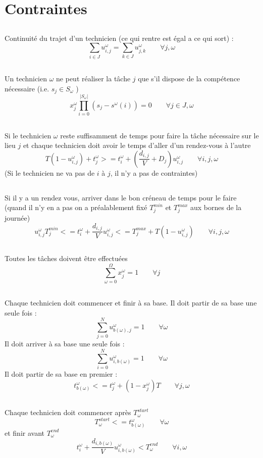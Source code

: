 \documentclass[a4paper, 11pt]{article} %
\begin{document}
\section{Contraintes}
\subsection{}
Continuité du trajet d'un technicien (ce qui rentre est égal a ce qui sort) :
$$  \sum_{ i \in J} u_{i,j}^{\omega} = \sum_{ k \in J} u_{j,k}^{\omega} \qquad \forall j,\omega $$

\subsection{}
Un technicien $\omega$ ne peut réaliser la tâche $j$ que s'il dispose de la compétence nécessaire (i.e. $s_j \in S_{\omega}$ )
$$ x_j^{\omega}\prod_{i=0}^{|S_{\omega}|}(s_j - s^{\omega}(i)) = 0 \qquad \forall j \in J ,\omega$$

\subsection{}
Si le technicien $\omega$ reste suffisamment de temps pour faire la tâche nécessaire sur le lieu $j$ et chaque technicien doit avoir le temps d'aller d'un rendez-vous à l'autre
$$ T(1-u_{i,j}^{\omega}) + t_j^{\omega} >= t_i^{\omega} + (\frac{d_{i,j}}{V} + D_j)u_{i,j}^{\omega} \qquad \forall i,j,\omega $$
(Si le technicien ne va pas de $i$ à $j$, il n'y a pas de contraintes)

\subsection{}
Si il y a un rendez vous, arriver dans le bon créneau de temps pour le faire (quand il n'y en a pas on a préalablement fixé $T_j^{min}$ et $T_j^{max}$ aux bornes de la journée)
$$ u_{i,j}^{\omega} T_j^{min} <= t_i^{\omega} + \frac{d_{i,j}}{V}u_{i,j}^{\omega} <= T_j^{max} +  T(1-u_{i,j}^{\omega}) \qquad \forall i,j,\omega $$

\subsection{}
Toutes les tâches doivent être effectuées
$$ \sum_{\omega=0}^{\Omega} x_j^{\omega} = 1 \qquad \forall j$$

\subsection{}
Chaque technicien doit commencer et finir à sa base.
Il doit partir de sa base une seule fois :
$$ \sum_{j=0}^{N} u_{b(\omega),j}^{\omega} = 1 \qquad \forall \omega$$
Il doit arriver à sa base une seule fois :
$$ \sum_{i=0}^{N} u_{i,b(\omega)}^{\omega} = 1 \qquad \forall \omega$$
Il doit partir de sa base en premier :
$$ t_{b(\omega)}^{\omega} <=  t_j^{\omega} + (1-x_j^{\omega})T \qquad \forall j,\omega$$

\subsection{}
Chaque technicien doit commencer après $T_{\omega}^{start}$ 
$$ T_{\omega}^{start} <=  t_{b(\omega)}^{\omega} \qquad \forall \omega$$
et finir avant $T_{\omega}^{end}$
$$  t_i^{\omega} + \frac{d_{i,b(\omega)}}{V}u_{i,b(\omega)}^{\omega} < T_{\omega}^{end} \qquad \forall i,\omega$$
\end{document}

